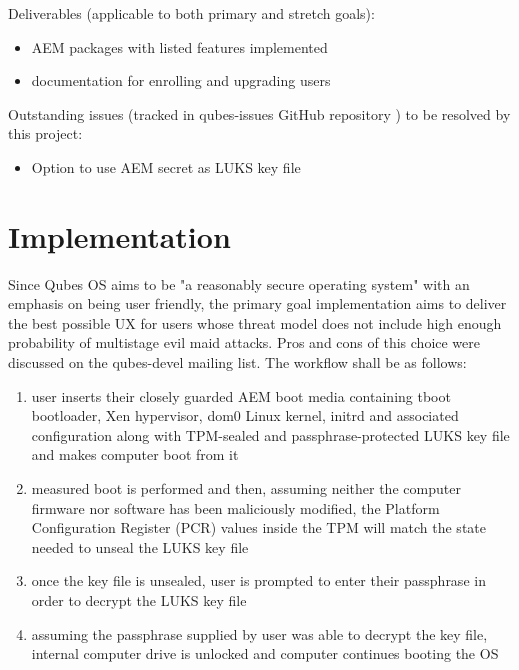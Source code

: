 \documentclass[10pt,a4paper,twocolumn]{article}
\begin{document}
Deliverables (applicable to both primary and stretch goals):
\begin{itemize}
  \item AEM packages with listed features implemented
  \item documentation for enrolling and upgrading users
\end{itemize}

Outstanding issues (tracked in qubes-issues GitHub repository
\cite{qubes-issues}) to be resolved by this project:
\begin{itemize}
  \item Option to use AEM secret as LUKS key file \cite{issue-1979}
\end{itemize}


\section{Implementation}

Since Qubes OS aims to be "a reasonably secure operating system" with an
emphasis on being user friendly, the primary goal implementation aims to
deliver the best possible UX for users whose threat model does not include high
enough probability of multistage evil maid attacks. Pros and cons of this
choice were discussed \cite{aem-discussion-thread} on the qubes-devel mailing
list. The workflow shall be as follows:
\begin{enumerate}
  \item user inserts their closely guarded AEM boot media containing tboot
    bootloader, Xen hypervisor, dom0 Linux kernel, initrd and associated
    configuration along with TPM-sealed and passphrase-protected LUKS key file
    and makes computer boot from it
  \item measured boot is performed and then, assuming neither the computer
    firmware nor software has been maliciously modified, the Platform
    Configuration Register (PCR) values inside the TPM will match the state
    needed to unseal the LUKS key file
  \item once the key file is unsealed, user is prompted to enter their
    passphrase in order to decrypt the LUKS key file
  \item assuming the passphrase supplied by user was able to decrypt the key
    file, internal computer drive is unlocked and computer continues booting
    the OS
\end{enumerate}
\end{document}
